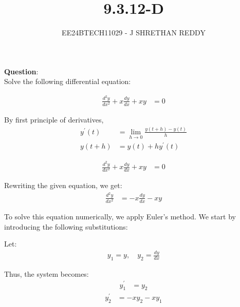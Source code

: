 \documentclass[journal]{IEEEtran}
\begin{document}

\vspace{3cm}

\title{9.3.12-D}
\author{EE24BTECH11029 - J SHRETHAN REDDY}
\maketitle
{\let\newpage\relax\maketitle}

\renewcommand{\thefigure}{\theenumi}
\renewcommand{\thetable}{\theenumi}
\setlength{\intextsep}{10pt} %


\renewcommand{\thetable}{\theenumi}

\textbf{Question}:\\
Solve the following differential equation:

\begin{align}
 \frac{d^2y}{dx^2} + x \frac{dy}{dx} + xy &= 0
\end{align}
\solution

By first principle of derivatives,
\begin{align}
    y^{\prime}(t) &= \lim_{h\to 0}\frac{y(t+h) - y(t)}{h} \\
    y(t+h) &= y(t) + hy^{\prime}(t)
\end{align}

\begin{align}
 \frac{d^2y}{dx^2} + x \frac{dy}{dx} + xy &= 0
\end{align}

Rewriting the given equation, we get:
\begin{align}
\frac{d^2y}{dx^2} &= -x \frac{dy}{dx} - xy
\end{align}

To solve this equation numerically, we apply Euler's method. We start by introducing the following substitutions:

Let:
\begin{align}
y_1 = y, \quad y_2 = \frac{dy}{dx}
\end{align}

Thus, the system becomes:
\begin{align}
y_1^\prime &= y_2
\end{align}
\begin{align}
y_2^\prime &= -xy_2 - xy_1
\end{align}
\end{document}
